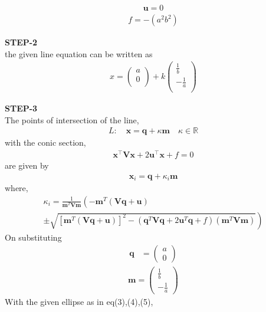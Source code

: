 \documentclass[10pt,a4paper]{report}
\newcommand{\myvec}[1]{\ensuremath{\begin{pmatrix}#1\end{pmatrix}}}
\let\vec\mathbf
\let\vec\mathbf
\providecommand{\brak}[1]{\ensuremath{\left(#1\right)}}
\providecommand{\lbrak}[1]{\ensuremath{\left(#1\right.}}
\providecommand{\rbrak}[1]{\ensuremath{\left.#1\right)}}
\providecommand{\sbrak}[1]{\ensuremath{{}\left[#1\right]}}
\begin{document}
\begin{multicols}{2}
\begin{align}
\vec{u}=0
\end{align} 
\begin{align}
f=-(a^2b^2)
\end{align} \vspace{2mm}


\textbf{STEP-2}\vspace{2mm}\\
the given line equation can be written as\\ 
\begin{align} 
	x=\begin{pmatrix}a \\ 0 \\ \end{pmatrix}+k\begin{pmatrix}\frac{1}{b} \\ -\frac{1}{a} \\ \end{pmatrix}
\end{align}

\textbf{STEP-3}\vspace{2mm}\\
The points of intersection of the line, \\ 
\begin{align}
L: \quad \vec{x} = \vec{q} + \kappa \vec{m} \quad \kappa \in \mathbb{R}
\end{align}
with the conic section, \\ 
\begin{align}
	\vec{x}^{\top}\vec{V}\vec{x} + 2\vec{u}^{\top} \vec{x} + f = 0
\end{align}
are given by \\
\begin{align}
\vec{x}_i = \vec{q} + \kappa_i \vec{m}
\end{align}
where, \\
{\tiny
\begin{multline}
\kappa_i = \frac{1}
{
\vec{m}^T\vec{V}\vec{m}
}
\lbrak{-\vec{m}^T\brak{\vec{V}\vec{q}+\vec{u}}}
\\
\pm
\rbrak{\sqrt{
\sbrak{
\vec{m}^T\brak{\vec{V}\vec{q}+\vec{u}}
}^2
-
\brak
{
\vec{q}^T\vec{V}\vec{q} + 2\vec{u}^T\vec{q} +f
}
\brak{\vec{m}^T\vec{V}\vec{m}}
}
}
\end{multline}
}
On substituting\\
\begin{align}
\vec{q} &= \myvec{
a\\
0
} 
\end{align}
\begin{align}
\vec{m} = \myvec{\frac{1}{b} \\ -\frac{1}{a}}
\end{align}
With the given ellipse as in eq(3),(4),(5),\\ 


\end{multicols}
\end{document}
